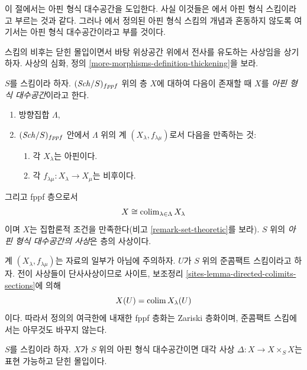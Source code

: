 \noindent
이 절에서는 아핀 형식 대수공간을 도입한다. 사실 이것들은
\cite{BVGD}에서 아핀 형식 스킴이라고 부르는 것과 같다. 그러나
\cite{EGA}에서 정의된 아핀 형식 스킴의 개념과 혼동하지 않도록
여기서는 아핀 형식 대수공간이라고 부를 것이다.

\medskip\noindent
스킴의 비후는 닫힌 몰입이면서 바탕 위상공간 위에서 전사를 유도하는
사상임을 상기하자. 사상의 심화, 정의
\ref{more-morphisms-definition-thickening}을 보라.

\begin{definition}
\label{definition-affine-formal-algebraic-space}
$S$를 스킴이라 하자. $(\mathit{Sch}/S)_{fppf}$ 위의 층 $X$에 대하여 다음이
존재할 때 $X$를 {\it 아핀 형식 대수공간}이라고 한다.
\begin{enumerate}
\item 방향집합 $\Lambda$,
\item $(\mathit{Sch}/S)_{fppf}$ 안에서 $\Lambda$ 위의 계
$(X_\lambda, f_{\lambda \mu})$로서 다음을 만족하는 것:
\begin{enumerate}
\item 각 $X_\lambda$는 아핀이다.
\item 각 $f_{\lambda \mu} : X_\lambda \to X_\mu$는 비후이다.
\end{enumerate}
\end{enumerate}
그리고 fppf 층으로서
$$
X \cong \mathop{\mathrm{colim}}\nolimits_{\lambda \in \Lambda} X_\lambda
$$
이며 $X$는 집합론적 조건을 만족한다(비고
\ref{remark-set-theoretic}를 보라). $S$ 위의 {\it 아핀 형식
대수공간의 사상}은 층의 사상이다.
\end{definition}

\noindent
계 $(X_\lambda, f_{\lambda \mu})$는 자료의 일부가 아님에 주의하자.
$U$가 $S$ 위의 준콤팩트 스킴이라고 하자. 전이 사상들이 단사사상이므로
사이트, 보조정리 \ref{sites-lemma-directed-colimits-sections}에 의해
$$
X(U) = \mathop{\mathrm{colim}}\nolimits X_\lambda(U)
$$
이다. 따라서 정의의 여극한에 내재한 fppf 층화는 Zariski 층화이며,
준콤팩트 스킴에서는 아무것도 바꾸지 않는다.

\begin{lemma}
\label{lemma-diagonal-affine-formal-algebraic-space}
$S$를 스킴이라 하자. $X$가 $S$ 위의 아핀 형식 대수공간이면 대각 사상
$\Delta : X \to X \times_S X$는 표현 가능하고 닫힌 몰입이다.
\end{lemma}

